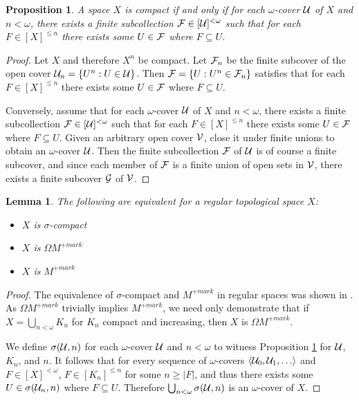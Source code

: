 \documentclass{amsart}
\theoremstyle{plain}
\newtheorem{lemma}[theorem]{Lemma}
\newtheorem{proposition}[theorem]{Proposition}
\theoremstyle{definition}
\theoremstyle{remark}
\theoremstyle{plain}
\theoremstyle{definition}
\theoremstyle{remark}
\begin{document}
\begin{proposition}\label{altCompactCharacterization}
  A space \(X\) is compact if and only if for each \(\omega\)-cover
  \(\mathcal{U}\) of \(X\) and \(n<\omega\), there exists a finite subcollection
  \(\mathcal{F}\in[\mathcal{U}]^{<\omega}\) such that for each \(F\in[X]^{\leq n}\)
  there exists some \(U\in\mathcal{F}\) where \(F\subseteq U\).
\end{proposition}

\begin{proof}
  Let \(X\) and therefore \(X^n\) be compact.
  Let \(\mathcal{F}_n\) be the finite subcover of the
  open cover \(\mathcal{U}_n=\{U^n:U\in\mathcal{U}\}\). Then
  \(\mathcal{F}=\{U:U^n\in\mathcal{F}_n\}\) satisfies that for each \(F\in[X]^{\leq n}\)
  there exists some \(U\in\mathcal{F}\) where \(F\subseteq U\).

  Conversely, assume that for each \(\omega\)-cover
  \(\mathcal{U}\) of \(X\) and \(n<\omega\), there exists a finite subcollection
  \(\mathcal{F}\in[\mathcal{U}]^{<\omega}\) such that for each \(F\in[X]^{\leq n}\)
  there exists some \(U\in\mathcal{F}\) where \(F\subseteq U\). Given an
  arbitrary open cover \(\mathcal{V}\), close it under finite unions to obtain
  an \(\omega\)-cover \(\mathcal{U}\). Then the finite subcollection \(\mathcal{F}\)
  of \(\mathcal{U}\) is of course a finite subcover,
  and since each member of \(\mathcal{F}\) is a finite union of open sets in
  \(\mathcal{V}\), there exists a finite subcover \(\mathcal{G}\) of \(\mathcal{V}\).
\end{proof}

\begin{lemma}
  The following are equivalent for a regular topological space \(X\):
  \begin{itemize}
    \item \(X\) is \(\sigma\)-compact
    \item \(X\) is \(\Omega M^{+mark}\)
    \item \(X\) is \(M^{+mark}\)
  \end{itemize}
\end{lemma}

\begin{proof}
  The equivalence of \(\sigma\)-compact and \(M^{+mark}\) in regular spaces
  was shown in \cite{clontzMengerCMUC}. As \(\Omega M^{+mark}\)
  trivially implies \(M^{+mark}\), we need only demonstrate that
  if \(X=\bigcup_{n<\omega} K_n\) for \(K_n\) compact and increasing,
  then \(X\) is \(\Omega M^{+mark}\).

  We define \(\sigma(\mathcal{U},n)\) for each \(\omega\)-cover \(\mathcal{U}\) and
  \(n<\omega\) to witness Proposition \ref{altCompactCharacterization}
  for \(\mathcal{U}\), \(K_n\), and \(n\). It follows that for every sequence of
  \(\omega\)-covers \(\<\mc U_0,\mc U_1,\dots\>\) and \(F\in[X]^{<\omega}\),
  \(F\in[K_n]^{\leq n}\) for some \(n\geq|F|\), and thus there exists some
  \(U\in\sigma(\mathcal{U}_n,n)\) where \(F\subseteq U\). Therefore
  \(\bigcup_{n<\omega}\sigma(\mathcal{U},n)\) is an \(\omega\)-cover of \(X\).
\end{proof}
\end{document}
